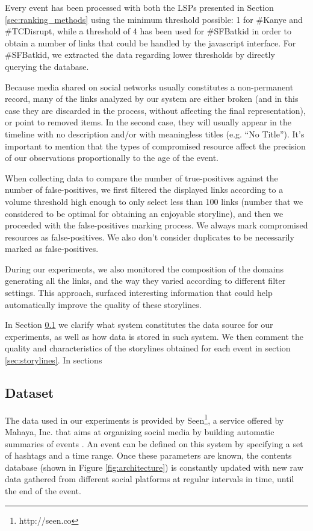 \documentclass{sig-alternate}
\begin{document}
Every event has been processed with both the LSPs presented in Section \ref{sec:ranking_methods} using the minimum threshold possible: 1 for \#Kanye and \#TCDisrupt, while a threshold of 4 has been used for \#SFBatkid in order to obtain a number of links that could be handled by the javascript interface. For \#SFBatkid, we extracted the data regarding lower thresholds by directly querying the database.

Because media shared on social networks usually constitutes a non-permanent record, many of the links analyzed by our system are either broken (and in this case they are discarded in the process, without affecting the final representation), or point to removed items. In the second case, they will usually appear in the timeline with no description and/or with meaningless titles (e.g. ``No Title''). It's important to mention that the types of compromised resource affect the precision of our observations proportionally to the age of the event.

When collecting data to compare the number of true-positives against the number of false-positives, we first filtered the displayed links according to a volume threshold high enough to only select less than 100 links (number that we considered to be optimal for obtaining an enjoyable storyline), and then we proceeded with the false-positives marking process. We always mark compromised resources as false-positives. We also don't consider duplicates to be necessarily marked as false-positives.

During our experiments, we also monitored the composition of the domains generating all the links, and the way they varied according to different filter settings. This approach, surfaced interesting information that could help automatically improve the quality of these storylines.

In Section \ref{sec:dataset} we clarify what system constitutes the data source for our experiments, as well as how data is stored in such system. We then comment the quality and characteristics of the storylines obtained for each event in section \ref{sec:storylines}. In sections

\subsection{Dataset}
\label{sec:dataset}
The data used in our experiments is provided by Seen\footnote{http://seen.co}, a service offered by Mahaya, Inc. that aims at organizing social media by building automatic summaries of events \cite{SeenWired}. An event can be defined on this system by specifying a set of hashtags and a time range. Once these parameters are known, the contents database (shown in Figure \ref{fig:architecture}) is constantly updated with new raw data gathered from different social platforms at regular intervals in time, until the end of the event.
\end{document}
